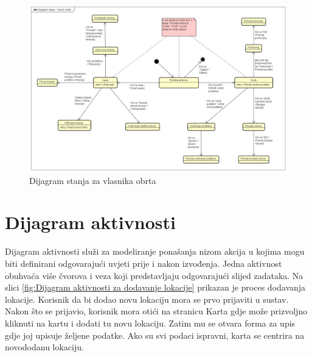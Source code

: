             \begin{figure}[H]
			    \includegraphics[width=\textwidth]{slike/Dijagram stanja - Vlasnik obrta.png} 
			        \caption{Dijagram stanja za vlasnika obrta}
			    \label{fig:Dijagram stanja za vlasnika obrta}
		    \end{figure}
			
		\newpage
		\section{Dijagram aktivnosti}
            Dijagram aktivnosti služi za modeliranje ponašanja nizom akcija u kojima mogu biti definirani odgovarajući uvjeti prije i nakon izvođenja. Jedna aktivnost obuhvaća više čvorova i veza koji predstavljaju odgovarajući slijed zadataka. Na slici \ref{fig:Dijagram aktivnosti za dodavanje lokacije} prikazan je proces dodavanja lokacije. Korisnik da bi dodao novu lokaciju mora se prvo prijaviti u sustav. Nakon što se prijavio, korisnik mora otići na stranicu Karta gdje može prizvoljno kliknuti na kartu i dodati tu novu lokaciju. Zatim mu se otvara forma za upis gdje joj upisuje željene podatke. Ako su svi podaci ispravni, karta se centrira na novododanu lokaciju.
            
